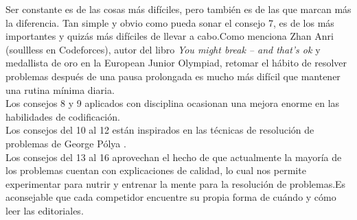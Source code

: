 Ser constante es de las cosas más difíciles, pero también es de las que marcan más la diferencia. Tan simple y obvio como pueda sonar el consejo 7, es de los más importantes y quizás más difíciles de llevar a cabo.Como menciona Zhan Anri (soullless en Codeforces), autor del libro \textit{You might break – and that's ok} \cite{soullless2025} y medallista de oro en la European Junior Olympiad,  retomar el hábito de resolver problemas después de una pausa prolongada es mucho más difícil que mantener una rutina mínima diaria.\\

Los consejos 8 y 9 aplicados con disciplina ocasionan una mejora enorme en las habilidades de codificación.\\

Los consejos del 10 al 12 están inspirados en las técnicas de resolución de problemas de George Pólya \cite{polya1957}.\\

Los consejos del 13 al 16 aprovechan el hecho de que actualmente la mayoría de los problemas cuentan con explicaciones de calidad, lo cual nos permite experimentar para nutrir y entrenar la mente para la resolución de problemas.Es aconsejable que cada competidor encuentre su propia forma de cuándo y cómo leer las editoriales.
\pagebreak
